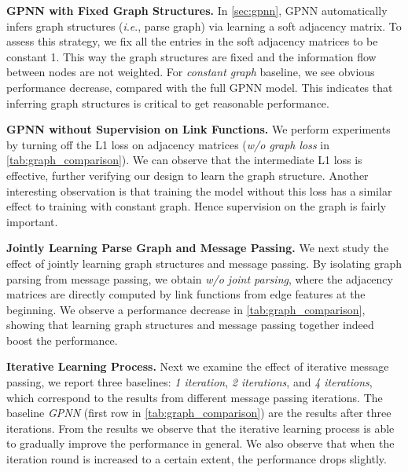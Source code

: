 \documentclass[runningheads]{llncs}
\newcommand{\ie}{\textit{i}.\textit{e}.}
\begin{document}
\noindent\textbf{GPNN with Fixed Graph Structures.} In \autoref{sec:gpnn}, GPNN automatically infers graph structures (\ie, parse graph) via learning a soft adjacency matrix. To assess this strategy, we fix all the entries in the soft adjacency matrices to be constant 1. This way the graph structures are fixed and the information flow between nodes are not weighted. For \textit{constant graph} baseline, we see obvious performance decrease, compared with the full GPNN model. This indicates that inferring graph structures is critical to get reasonable performance.

\noindent\textbf{GPNN without Supervision on Link Functions.} We perform experiments by turning off the L1 loss on adjacency matrices (\textit{w/o graph loss} in \autoref{tab:graph_comparison}). We can observe that the intermediate L1 loss is effective, further verifying our design to learn the graph structure. Another interesting observation is that training the model without this loss has a similar effect to training with constant graph. Hence supervision on the graph is fairly important.

\noindent\textbf{Jointly Learning Parse Graph and Message Passing.} We next study the effect of jointly learning graph structures and message passing. By isolating graph parsing from message passing, we obtain \textit{w/o joint parsing}, where the adjacency matrices are directly computed by link functions from edge features at the beginning. We observe a performance decrease in \autoref{tab:graph_comparison}, showing that learning graph structures and message passing together indeed boost the performance.

\noindent\textbf{Iterative Learning Process.} Next we examine the effect of iterative message passing, we report three baselines: \textit{1 iteration}, \textit{2 iterations}, and \textit{4 iterations}, which correspond to the results from different message passing iterations. The baseline \textit{GPNN} (first row in \autoref{tab:graph_comparison}) are the results after three iterations. From the results we observe that the iterative learning process is able to gradually improve the performance in general. We also observe that when the iteration round is increased to a certain extent, the performance drops slightly.
\end{document}
